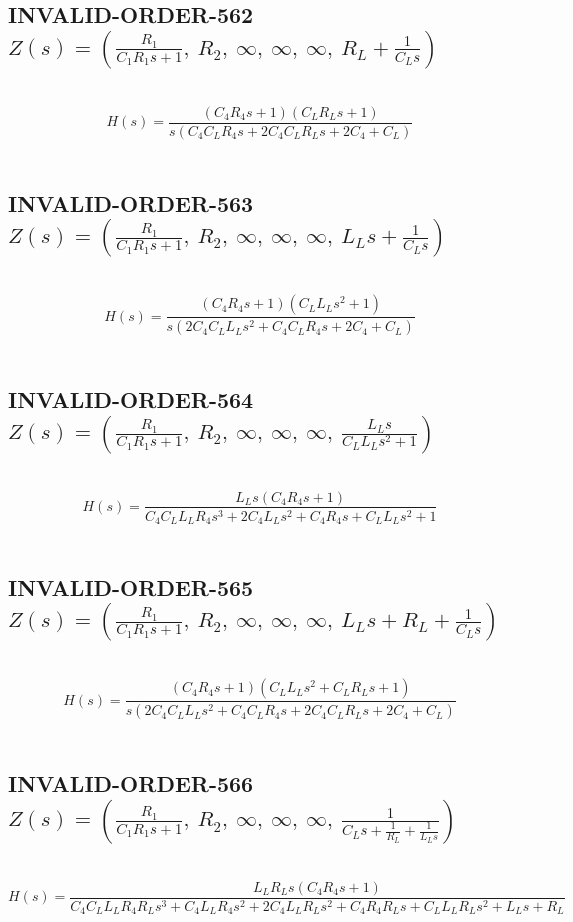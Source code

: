 \documentclass{article}
\begin{document}
\subsection{INVALID-ORDER-562 $Z(s) = \left( \frac{R_{1}}{C_{1} R_{1} s + 1}, \  R_{2}, \  \infty, \  \infty, \  \infty, \  R_{L} + \frac{1}{C_{L} s}\right)$ } \ 
\textbf{\[H(s) = \frac{\left(C_{4} R_{4} s + 1\right) \left(C_{L} R_{L} s + 1\right)}{s \left(C_{4} C_{L} R_{4} s + 2 C_{4} C_{L} R_{L} s + 2 C_{4} + C_{L}\right)}\] } \ 
\subsection{INVALID-ORDER-563 $Z(s) = \left( \frac{R_{1}}{C_{1} R_{1} s + 1}, \  R_{2}, \  \infty, \  \infty, \  \infty, \  L_{L} s + \frac{1}{C_{L} s}\right)$ } \ 
\textbf{\[H(s) = \frac{\left(C_{4} R_{4} s + 1\right) \left(C_{L} L_{L} s^{2} + 1\right)}{s \left(2 C_{4} C_{L} L_{L} s^{2} + C_{4} C_{L} R_{4} s + 2 C_{4} + C_{L}\right)}\] } \ 
\subsection{INVALID-ORDER-564 $Z(s) = \left( \frac{R_{1}}{C_{1} R_{1} s + 1}, \  R_{2}, \  \infty, \  \infty, \  \infty, \  \frac{L_{L} s}{C_{L} L_{L} s^{2} + 1}\right)$ } \ 
\textbf{\[H(s) = \frac{L_{L} s \left(C_{4} R_{4} s + 1\right)}{C_{4} C_{L} L_{L} R_{4} s^{3} + 2 C_{4} L_{L} s^{2} + C_{4} R_{4} s + C_{L} L_{L} s^{2} + 1}\] } \ 
\subsection{INVALID-ORDER-565 $Z(s) = \left( \frac{R_{1}}{C_{1} R_{1} s + 1}, \  R_{2}, \  \infty, \  \infty, \  \infty, \  L_{L} s + R_{L} + \frac{1}{C_{L} s}\right)$ } \ 
\textbf{\[H(s) = \frac{\left(C_{4} R_{4} s + 1\right) \left(C_{L} L_{L} s^{2} + C_{L} R_{L} s + 1\right)}{s \left(2 C_{4} C_{L} L_{L} s^{2} + C_{4} C_{L} R_{4} s + 2 C_{4} C_{L} R_{L} s + 2 C_{4} + C_{L}\right)}\] } \ 
\subsection{INVALID-ORDER-566 $Z(s) = \left( \frac{R_{1}}{C_{1} R_{1} s + 1}, \  R_{2}, \  \infty, \  \infty, \  \infty, \  \frac{1}{C_{L} s + \frac{1}{R_{L}} + \frac{1}{L_{L} s}}\right)$ } \ 
\textbf{\[H(s) = \frac{L_{L} R_{L} s \left(C_{4} R_{4} s + 1\right)}{C_{4} C_{L} L_{L} R_{4} R_{L} s^{3} + C_{4} L_{L} R_{4} s^{2} + 2 C_{4} L_{L} R_{L} s^{2} + C_{4} R_{4} R_{L} s + C_{L} L_{L} R_{L} s^{2} + L_{L} s + R_{L}}\] } \ 
\end{document}
